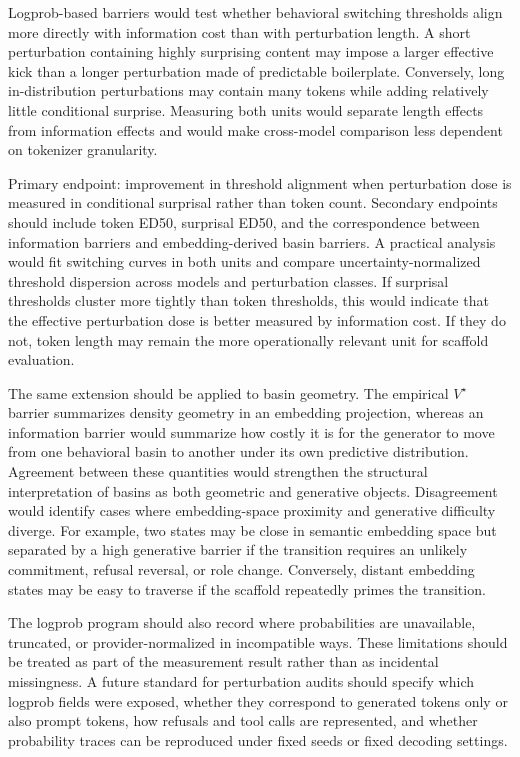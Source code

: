 \documentclass{article}
\theoremstyle{plain}
\theoremstyle{definition}
\begin{document}
Logprob-based barriers would test whether behavioral switching thresholds align more directly with information cost than with perturbation length. A short perturbation containing highly surprising content may impose a larger effective kick than a longer perturbation made of predictable boilerplate. Conversely, long in-distribution perturbations may contain many tokens while adding relatively little conditional surprise. Measuring both units would separate length effects from information effects and would make cross-model comparison less dependent on tokenizer granularity.

Primary endpoint: improvement in threshold alignment when perturbation dose is measured in conditional surprisal rather than token count. Secondary endpoints should include token ED50, surprisal ED50, and the correspondence between information barriers and embedding-derived basin barriers. A practical analysis would fit switching curves in both units and compare uncertainty-normalized threshold dispersion across models and perturbation classes. If surprisal thresholds cluster more tightly than token thresholds, this would indicate that the effective perturbation dose is better measured by information cost. If they do not, token length may remain the more operationally relevant unit for scaffold evaluation.

The same extension should be applied to basin geometry. The empirical \(V^\star\) barrier summarizes density geometry in an embedding projection, whereas an information barrier would summarize how costly it is for the generator to move from one behavioral basin to another under its own predictive distribution. Agreement between these quantities would strengthen the structural interpretation of basins as both geometric and generative objects. Disagreement would identify cases where embedding-space proximity and generative difficulty diverge. For example, two states may be close in semantic embedding space but separated by a high generative barrier if the transition requires an unlikely commitment, refusal reversal, or role change. Conversely, distant embedding states may be easy to traverse if the scaffold repeatedly primes the transition.

The logprob program should also record where probabilities are unavailable, truncated, or provider-normalized in incompatible ways. These limitations should be treated as part of the measurement result rather than as incidental missingness. A future standard for perturbation audits should specify which logprob fields were exposed, whether they correspond to generated tokens only or also prompt tokens, how refusals and tool calls are represented, and whether probability traces can be reproduced under fixed seeds or fixed decoding settings.
\end{document}

